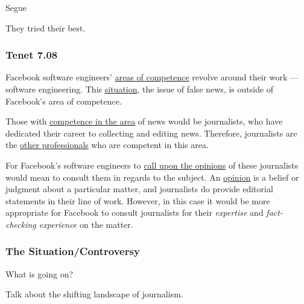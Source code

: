 \par Segue


\par They tried their best.

\subsubsection{Tenet 7.08}


\par Facebook software engineers' \ul{areas of competence} revolve around their work --- software engineering. This \ul{situation}, the issue of false news, is outside of Facebook's area of competence.

\par Those with \ul{competence in the area} of news would be journalists, who have dedicated their career to collecting and editing news. \cite{merriam_webster} Therefore, journalists are the \ul{other professionals} who are competent in this area.

\par For Facebook's software engineers to \ul{call upon the opinions} of these journalists would mean to consult them in regards to the subject. An \ul{opinion} is a belief or judgment about a particular matter, \cite{merriam_webster} and journalists do provide editorial statements in their line of work. However, in this case it would be more appropriate for Facebook to consult journalists for their \emph{expertise} and \emph{fact-checking experience} on the matter.


% 
\subsubsection{The Situation/Controversy}

\par What is going on?


\par Talk about the shifting landscape of journalism.

